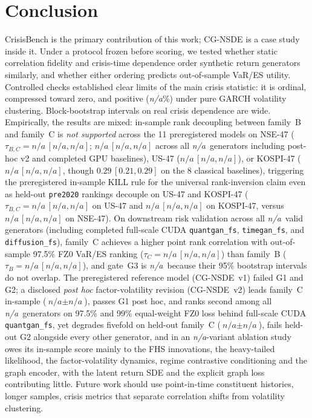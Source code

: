 \documentclass[journal]{IEEEtran}
\newcommand{\pendingnum}{\textit{n/a}}
\providecommand{\nGenerators}{\pendingnum}
\providecommand{\nRiskGenerators}{\pendingnum}
\providecommand{\nAblationVariants}{\pendingnum}
\providecommand{\tauBCnseFull}{\pendingnum}
\providecommand{\tauBCnseFullLo}{\pendingnum}
\providecommand{\tauBCnseFullHi}{\pendingnum}
\providecommand{\tauBCnseFullPrereg}{\pendingnum}
\providecommand{\tauBCnseFullPreregLo}{\pendingnum}
\providecommand{\tauBCnseFullPreregHi}{\pendingnum}
\providecommand{\tauBCnseHeldPrereg}{\pendingnum}
\providecommand{\tauBCnseHeldPreregLo}{\pendingnum}
\providecommand{\tauBCnseHeldPreregHi}{\pendingnum}
\providecommand{\tauBCusFullPrereg}{\pendingnum}
\providecommand{\tauBCusFullPreregLo}{\pendingnum}
\providecommand{\tauBCusFullPreregHi}{\pendingnum}
\providecommand{\tauBCusHeldPrereg}{\pendingnum}
\providecommand{\tauBCusHeldPreregLo}{\pendingnum}
\providecommand{\tauBCusHeldPreregHi}{\pendingnum}
\providecommand{\tauBCkrFullPrereg}{\pendingnum}
\providecommand{\tauBCkrFullPreregLo}{\pendingnum}
\providecommand{\tauBCkrFullPreregHi}{\pendingnum}
\providecommand{\tauBCkrHeldPrereg}{\pendingnum}
\providecommand{\tauBCkrHeldPreregLo}{\pendingnum}
\providecommand{\tauBCkrHeldPreregHi}{\pendingnum}
\providecommand{\tauRiskB}{\pendingnum}
\providecommand{\tauRiskBLo}{\pendingnum}
\providecommand{\tauRiskBHi}{\pendingnum}
\providecommand{\tauRiskC}{\pendingnum}
\providecommand{\tauRiskCLo}{\pendingnum}
\providecommand{\tauRiskCHi}{\pendingnum}
\providecommand{\scoreCCgnsdeTwoFull}{\pendingnum}
\providecommand{\scoreCCgnsdeTwoFullSd}{\pendingnum}
\providecommand{\scoreCCgnsdeTwoHeld}{\pendingnum}
\providecommand{\scoreCCgnsdeTwoHeldSd}{\pendingnum}
\providecommand{\dgpSimCccBoost}{\pendingnum}
\providecommand{\verdictGThree}{\pendingnum}
\begin{document}
\section{Conclusion}
CrisisBench is the primary contribution of this work; CG-NSDE is a case study inside it. Under a protocol
frozen before scoring, we tested whether static correlation fidelity and crisis-time dependence order
synthetic return generators similarly, and whether either ordering predicts out-of-sample VaR/ES utility.
Controlled checks established clear limits of the main crisis statistic: it is ordinal, compressed toward
zero, and positive (\dgpSimCccBoost\%) under pure GARCH volatility clustering. Block-bootstrap intervals on
real crisis dependence are wide. Empirically, the results are mixed: in-sample rank decoupling between family~B
and family~C is \emph{not supported} across the 11 preregistered models on NSE-47 ($\tau_{B,C} =
\tauBCnseFullPrereg\,[\tauBCnseFullPreregLo,\tauBCnseFullPreregHi]$;
$\tauBCnseFull\,[\tauBCnseFullLo,\tauBCnseFullHi]$ across all \nGenerators\ generators including post-hoc v2 and
completed GPU baselines), US-47 ($\tauBCusFullPrereg\,[\tauBCusFullPreregLo,\tauBCusFullPreregHi]$), or KOSPI-47
($\tauBCkrFullPrereg\,[\tauBCkrFullPreregLo,\tauBCkrFullPreregHi]$, though $0.29\,[0.21,0.29]$ on the 8
classical baselines), triggering the preregistered in-sample KILL rule for the universal rank-inversion claim
even as held-out \texttt{pre2020} rankings decouple on US-47 and KOSPI-47 ($\tau_{B,C} =
\tauBCusHeldPrereg\,[\tauBCusHeldPreregLo,\tauBCusHeldPreregHi]$ on US-47 and
$\tauBCkrHeldPrereg\,[\tauBCkrHeldPreregLo,\tauBCkrHeldPreregHi]$ on KOSPI-47, versus
$\tauBCnseHeldPrereg\,[\tauBCnseHeldPreregLo,\tauBCnseHeldPreregHi]$ on NSE-47). On downstream risk
validation across all \nRiskGenerators\ valid generators (including completed full-scale CUDA
\texttt{quantgan\_fs}, \texttt{timegan\_fs}, and \texttt{diffusion\_fs}), family~C achieves a higher point rank correlation with
out-of-sample 97.5\% FZ0 VaR/ES ranking ($\tau_C = \tauRiskC\,[\tauRiskCLo,\tauRiskCHi]$) than family~B
($\tau_B = \tauRiskB\,[\tauRiskBLo,\tauRiskBHi]$), and gate~G3 is \verdictGThree\ because their 95\%
bootstrap intervals do not overlap. The preregistered reference model (CG-NSDE~v1) failed G1 and G2; a
disclosed \emph{post hoc} factor-volatility revision (CG-NSDE~v2) leads family~C in-sample
($\scoreCCgnsdeTwoFull \pm \scoreCCgnsdeTwoFullSd$), passes G1 post hoc, and ranks second among all
\nRiskGenerators\ generators on 97.5\% and 99\% equal-weight FZ0 loss behind full-scale CUDA
\texttt{quantgan\_fs}, yet degrades fivefold on held-out family~C ($\scoreCCgnsdeTwoHeld \pm
\scoreCCgnsdeTwoHeldSd$), fails held-out G2 alongside every other generator, and in an
\nAblationVariants-variant ablation study owes its in-sample score mainly to the FHS innovations, the
heavy-tailed likelihood, the factor-volatility dynamics, regime contrastive conditioning and the graph encoder,
with the latent return SDE and the explicit graph loss contributing little. Future work should use point-in-time constituent histories,
longer samples, crisis metrics that separate correlation shifts from volatility clustering.



\end{document}
